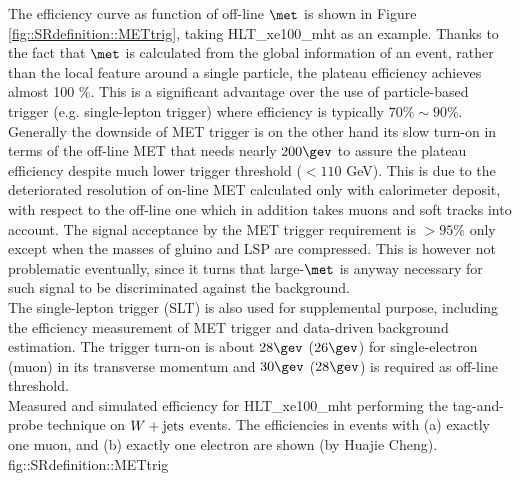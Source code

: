 
The efficiency curve as function of off-line $\met$ is shown in Figure \ref{fig::SRdefinition::METtrig}, taking HLT\_xe100\_mht as an example.
Thanks to the fact that $\met$ is calculated from the global information of an event, rather than the local feature around a single particle, the plateau efficiency achieves almost 100 $\%$. 
This is a significant advantage over the use of particle-based trigger (e.g. single-lepton trigger) where efficiency is typically $70\% \sim 90\%$. 
Generally the downside of MET trigger is on the other hand its slow turn-on in terms of the off-line MET that needs nearly $200 \gev$ to assure the plateau efficiency despite much lower trigger threshold ($<110$ GeV). This is due to the deteriorated resolution of on-line MET calculated only with calorimeter deposit, with respect to the off-line one which in addition takes muons and soft tracks into account. 
The signal acceptance by the MET trigger requirement is $>95\%$ only except when the masses of gluino and LSP are compressed. 
This is however not problematic eventually, since it turns that large-$\met$ is anyway necessary for such signal to be discriminated against the background. \\


The single-lepton trigger (SLT) is also used for supplemental purpose, including the efficiency measurement of MET trigger and data-driven background estimation. 
The trigger turn-on is about $28\gev$ ($26\gev$) for single-electron (muon) in its transverse momentum and $30\gev$ ($28\gev$) is required as off-line threshold. \\

{Measured and simulated efficiency for HLT\_xe100\_mht performing the tag-and-probe technique on $W+\mathrm{jets}$ events. The efficiencies in events with (a) exactly one muon, and (b) exactly one electron are shown (by Huajie Cheng).}
{fig::SRdefinition::METtrig}


